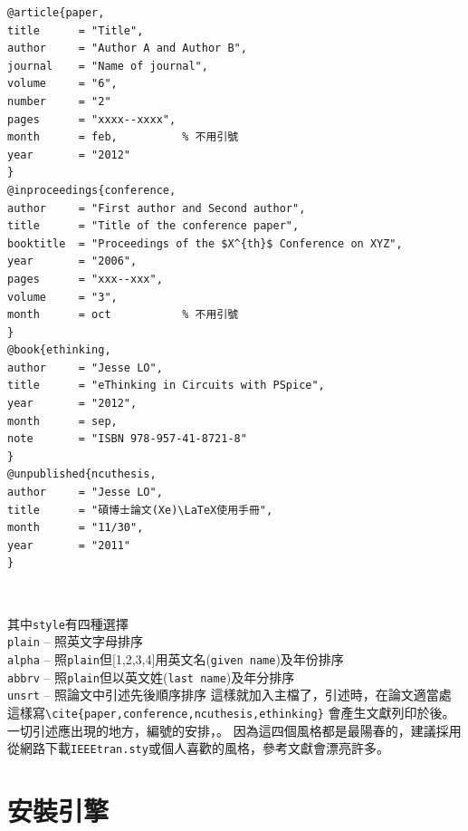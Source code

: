 \begin{Verbatim}[frame=single,firstline=1,lastline=32,rulecolor=\color{red},label=Typing up myfoo.tex]
@article{paper,
title      = "Title",
author     = "Author A and Author B",
journal    = "Name of journal",
volume     = "6",
number     = "2"
pages      = "xxxx--xxxx",
month      = feb,          % 不用引號
year       = "2012"
}
@inproceedings{conference,
author     = "First author and Second author",
title      = "Title of the conference paper",
booktitle  = "Proceedings of the $X^{th}$ Conference on XYZ",
year       = "2006",
pages      = "xxx--xxx",
volume     = "3",
month      = oct           % 不用引號
}
@book{ethinking,
author     = "Jesse LO",
title      = "eThinking in Circuits with PSpice",
year       = "2012",
month      = sep,
note       = "ISBN 978-957-41-8721-8"
}
@unpublished{ncuthesis,
author     = "Jesse LO",
title      = "碩博士論文(Xe)\LaTeX使用手冊",
month      = "11/30",          
year       = "2011"
}
\end{Verbatim}
\begin{Verbatim}[frame=single,rulecolor=\color{red},label=Add this]


\end{Verbatim}
其中{\tt style}有四種選擇\\ 
{\tt plain} -- 照英文字母排序\\
{\tt alpha} -- 照{\tt plain}但[1,2,3,4]用英文名({\tt given name})及年份排序\\
{\tt abbrv} -- 照{\tt plain}但以英文姓({\tt last name})及年分排序\\
{\tt unsrt} -- 照論文中引述先後順序排序
這樣就加入主檔了，引述時，在論文適當處這樣寫\verb+\cite{paper,conference,ncuthesis,ethinking}+
會產生文獻列印於後。一切引述應出現的地方，編號的安排，。
因為這四個風格都是最陽春的，建議採用從網路下載{\tt IEEEtran.sty}或個人喜歡的風格，參考文獻會漂亮許多。


\section{安裝引擎}
